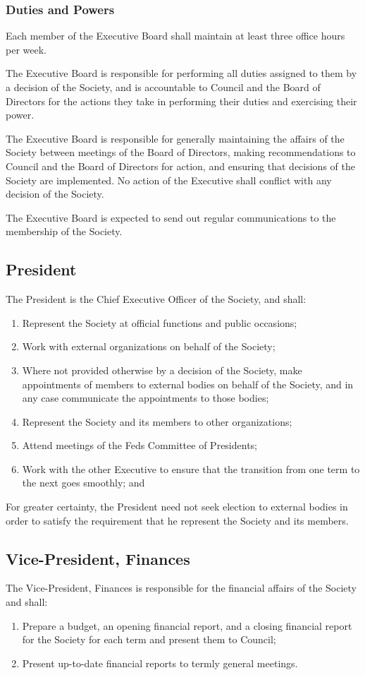 \subsubsection{Duties and Powers}
Each member of the Executive Board shall maintain at least three office hours
per week.

The Executive Board is responsible for performing all duties assigned to them
by a decision of the Society, and is accountable to Council and the
Board of Directors for the actions they take in performing their duties and
exercising their power.

The Executive Board is responsible for generally maintaining the affairs of the
Society between meetings of the Board of Directors, making recommendations to
Council and the Board of Directors for action, and ensuring that
decisions of the Society are implemented.  No action of the Executive shall
conflict with any decision of the Society.

The Executive Board is expected to send out regular communications to the
membership of the Society.

\subsection{President}
The President is the Chief Executive Officer of the Society, and shall:
\begin{enumerate}
  \item Represent the Society at official functions and public occasions;
  \item Work with external organizations on behalf of the Society;
  \item Where not provided otherwise by a decision of the Society, make
    appointments of members to external bodies on behalf of the Society, and in
    any case communicate the appointments to those bodies;
  \item Represent the Society and its members to other organizations;
  \item Attend meetings of the Feds Committee of Presidents;
  \item Work with the other Executive to ensure that the transition from one
    term to the next goes smoothly; and
\end{enumerate}

For greater certainty, the President need not seek election to external bodies
in order to satisfy the requirement that he represent the Society and its
members.

\subsection{Vice-President, Finances}
The Vice-President, Finances is responsible for the financial affairs of the
Society and shall:
\begin{enumerate}
  \item Prepare a budget, an opening financial report, and a closing financial
    report for the Society for each term and present them to Council;
  \item Present up-to-date financial reports to termly general meetings.
\end{enumerate}

